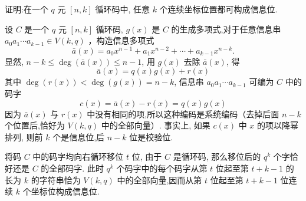 \begin{exercise}
    证明:在一个 $ q $ 元 $ [n, k] $ 循环码中, 任意 $ k $ 个连续坐标位置都可构成信息位.
\end{exercise}
\begin{solution}
   
设 $ C $ 是一个 $ q $ 元 $ [n, k] $ 循环码, $ g(x) $ 是 $ C $ 的生成多项式,对于任意信息串 $ a_{0} a_{1} \cdots a_{k-1} \in V(k, q) $ ，构造信息多项式
$$
\bar{a}(x)=a_{0} x^{n-1}+a_{1} x^{n-2}+\cdots+a_{k-1} x^{n-k} .
$$
显然, $ n-k \leq \operatorname{deg}(\bar{a}(x)) \leq n-1 $, 用 $ g(x) $ 去除 $ \bar{a}(x) $, 得
$$
\bar{a}(x)=q(x) g(x)+r(x)
$$
其中 $ \operatorname{deg}(r(x))<\operatorname{deg}(g(x))=n-k $, 信息串 $ a_{0} a_{1} \cdots a_{k-1} $ 可编为 $ C $ 中的码字
$$
c(x)=\bar{a}(x)-r(x)=q(x) g(x)
$$
因为 $ \bar{a}(x) $ 与 $ r(x) $ 中没有相同的项,所以这种编码是系统编码（去掉后面 $ n-k $ 个位置后,恰好为 $ V(k, q) $ 中的全部向量）. 事实上, 如果 $ c(x) $ 中 $ x $ 的项以降幂排列, 则前 $ k $ 个是信息位,后 $ n-k $ 位是校验位.

将码 $ C $ 中的码字均向右循环移位 $ t $ 位, 由于 $ C $ 是循环码, 那么移位后的 $ q^{k} $ 个字恰好还是 $ C $ 的全部码字. 此时 $ q^{k} $ 个码字中的每个码字从第 $ t $ 位起至第 $ t+k-1 $ 的长为 $ k $ 的字符串恰为 $ V(k, q) $ 中的全部向量,因而从第 $ t $ 位起至第 $ t+k-1 $ 位连续 $ k $ 个坐标位构成信息位.
\end{solution}






